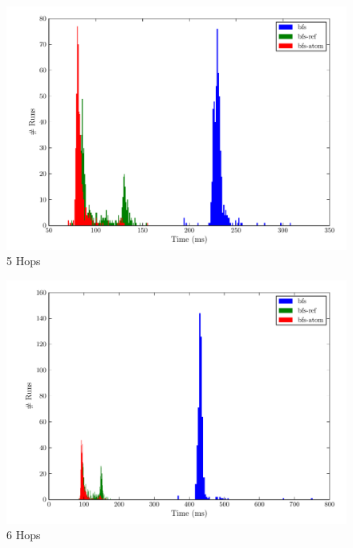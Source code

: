 \documentclass[12pt,letterpaper,oneside,notitlepage]{report}
\theoremstyle{definition}
\begin{document}
		\begin{figure}[!ht]
			\centering
			\includegraphics[scale=0.85]{5_hops}
			\caption{5 Hops}
			\label{fig:perf-5-hops}
		\end{figure}
		
		\begin{figure}[!ht]
			\centering
			\includegraphics[scale=0.85]{6_hops}
			\caption{6 Hops}
			\label{fig:perf-6-hops}
		\end{figure}
		
\end{document}
